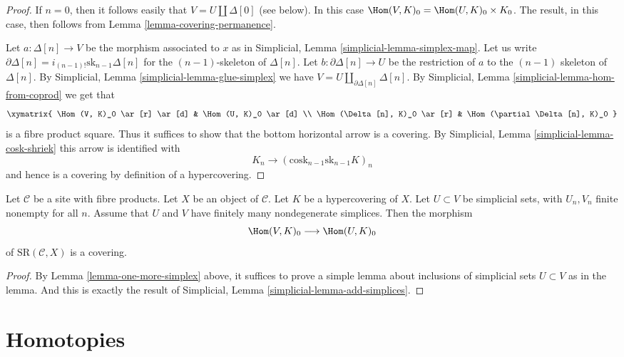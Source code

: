 \begin{proof}
If $n = 0$, then it follows easily that $V = U \amalg \Delta[0]$
(see below). In this case $\Hom(V, K)_0 =
\Hom(U, K)_0 \times K_0$. The result, in this case, then follows
from Lemma \ref{lemma-covering-permanence}.

\medskip\noindent
Let $a : \Delta[n] \to V$ be the morphism associated to $x$
as in Simplicial, Lemma \ref{simplicial-lemma-simplex-map}.
Let us write $\partial \Delta[n] = i_{(n-1)!} \text{sk}_{n - 1} \Delta[n]$
for the $(n - 1)$-skeleton of $\Delta[n]$.
Let $b : \partial \Delta[n] \to U$ be the restriction
of $a$ to the $(n - 1)$ skeleton of $\Delta[n]$. By
Simplicial, Lemma \ref{simplicial-lemma-glue-simplex}
we have $V = U \amalg_{\partial \Delta[n]} \Delta[n]$. By
Simplicial, Lemma
\ref{simplicial-lemma-hom-from-coprod}
we get that
$$
\xymatrix{
\Hom(V, K)_0 \ar[r] \ar[d] &
\Hom(U, K)_0 \ar[d] \\
\Hom(\Delta[n], K)_0 \ar[r] &
\Hom(\partial \Delta[n], K)_0
}
$$
is a fibre product square. Thus it suffices to show that
the bottom horizontal arrow is a covering. By
Simplicial, Lemma \ref{simplicial-lemma-cosk-shriek}
this arrow is identified with
$$
K_n \to (\text{cosk}_{n - 1} \text{sk}_{n - 1} K)_n
$$
and hence is a covering by definition of a hypercovering.
\end{proof}

\begin{lemma}
\label{lemma-add-simplices}
Let $\mathcal{C}$ be a site with fibre products.
Let $X$ be an object of $\mathcal{C}$.
Let $K$ be a hypercovering of $X$.
Let $U \subset V$ be simplicial sets, with $U_n, V_n$
finite nonempty for all $n$.
Assume that $U$ and $V$ have finitely many nondegenerate simplices.
Then the morphism
$$
\Hom(V, K)_0
\longrightarrow
\Hom(U, K)_0
$$
of $\text{SR}(\mathcal{C}, X)$ is a covering.
\end{lemma}

\begin{proof}
By Lemma \ref{lemma-one-more-simplex}
above, it suffices to prove a simple lemma
about inclusions of simplicial sets $U \subset V$ as in the
lemma. And this is exactly the result of
Simplicial, Lemma \ref{simplicial-lemma-add-simplices}.
\end{proof}




\section{Homotopies}
\label{section-homotopies}

